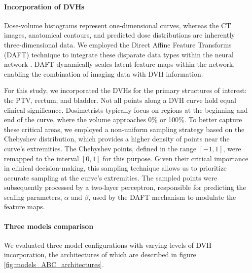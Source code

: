 \paragraph{Incorporation of DVHs}
Dose-volume histograms represent one-dimensional curves, whereas the CT images, anatomical contours, and predicted dose distributions are inherently three-dimensional data.
We employed the Direct Affine Feature Transforms (DAFT) technique to integrate these disparate data types within the neural network \cite{Polsterl2021}.
DAFT dynamically scales latent feature maps within the network, enabling the combination of imaging data with DVH information.

For this study, we incorporated the DVHs for the primary structures of interest: the PTV, rectum, and bladder.
Not all points along a DVH curve hold equal clinical significance.
Dosimetrists typically focus on regions at the beginning and end of the curve, where the volume approaches 0\% or 100\%.
To better capture these critical areas, we employed a non-uniform sampling strategy based on the Chebyshev distribution, which provides a higher density of points near the curve's extremities.
The Chebyshev points, defined in the range $\left[ -1, 1 \right]$, were remapped to the interval $\left[ 0, 1 \right]$ for this purpose.
Given their critical importance in clinical decision-making, this sampling technique allows us to prioritize accurate sampling at the curve's extremities.
The sampled points were subsequently processed by a two-layer perceptron, responsible for predicting the scaling parameters, $\alpha$ and $\beta$, used by the DAFT mechanism to modulate the feature maps.

\paragraph{Three models comparison}
We evaluated three model configurations with varying levels of DVH incorporation, the architectures of which are described in figure \ref{fig:models_ABC_architectures}.

